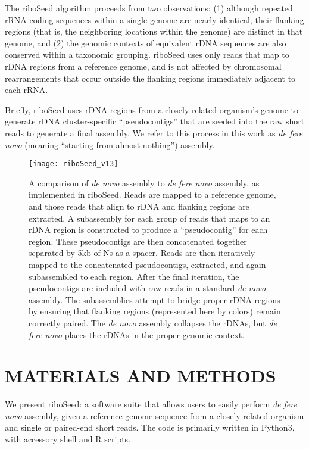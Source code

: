 \documentclass[a4,center,fleqn]{NAR}
\begin{document}
The riboSeed algorithm proceeds from two observations: (1) although repeated rRNA coding sequences within a single genome are nearly identical, their flanking regions (that is, the neighboring locations within the genome) are distinct in that genome, and (2) the genomic contexts of equivalent rDNA sequences are also conserved within a taxonomic grouping. riboSeed uses only reads that map to rDNA regions from a reference genome, and is not affected by chromosomal rearrangements that occur outside the flanking regions immediately adjacent to each rRNA.


Briefly, riboSeed uses rDNA regions from a closely-related organism's genome to generate rDNA cluster-specific ``pseudocontigs'' that are seeded into the raw short reads to generate a final assembly. We refer to this process in this work as \textit{de fere novo} (meaning ``starting from almost nothing'') assembly.



\begin{figure*}[t]
  \begin{center}
  \texttt{[image: riboSeed\_v13]}
  \end{center}
  \label{fig:overview}
  \caption{A comparison of \textit{de novo} assembly to \textit{de fere novo} assembly, as implemented in riboSeed. Reads are mapped to a reference genome, and those reads that align to rDNA and flanking regions are extracted. A subassembly for each group of reads that maps to an rDNA region is constructed to produce a ``pseudocontig'' for each region. These pseudocontigs are then concatenated together separated by 5kb of Ns as a spacer. Reads are then iteratively mapped to the concatenated pseudocontigs, extracted, and again subassembled to each region. After the final iteration, the pseudocontigs are included with raw reads in a standard \textit{de novo} assembly. The subassemblies attempt to bridge proper rDNA regions by ensuring that flanking regions (represented here by colors) remain correctly paired. The \textit{de novo} assembly collapses the rDNAs, but \textit{de fere novo} places the rDNAs in the proper genomic context.
  }
\end{figure*}


\section{MATERIALS AND METHODS}
We present riboSeed: a software suite that allows users to easily perform \textit{de fere novo} assembly, given a reference genome sequence from a closely-related organism and single or paired-end short reads. The code is primarily written in Python3, with accessory shell and R scripts.
\end{document}
